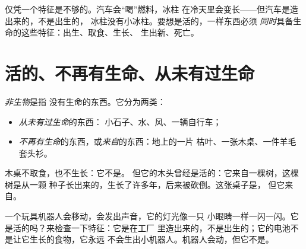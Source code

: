 \begin{remark}[每一个特征都重要]\label{rem:g1:living-or-not:allsigns}
仅凭一个特征是不够的。汽车会“喝”燃料，冰柱
在冷天里会变长——但汽车是造出来的，不是出生的，
冰柱没有小冰柱。要想是活的，一样东西必须
\emph{同时}具备生命的这些特征：出生、取食、生长、
生出新、死亡。
\end{remark}

\section{活的、不再有生命、从未有过生命}

\begin{definition}[非生物]\label{def:g1:living-or-not:nonliving}
\emph{非生物}是指
没有生命的东西。它分为两类：
\begin{itemize}
  \item \emph{从未有过生命}的东西：
        小石子、水、风、一辆自行车；
  \item \emph{不再有生命}的东西，或\emph{来自}的东西：地上的一片
        枯叶、一张木桌、一件羊毛套头衫。
\end{itemize}
\end{definition}

\begin{example}[木桌]\label{ex:g1:living-or-not:table}
木桌不取食，也不生长：它不是。
但它的木头曾经是活的：它来自一棵树，这棵树是从一颗
种子长出来的，生长了许多年，后来被砍倒。这张桌子是，
但它来自。
\end{example}

\begin{example}[机器人呢？]\label{ex:g1:living-or-not:robot}
一个玩具机器人会移动，会发出声音，它的灯光像一只
小眼睛一样一闪一闪。它是活的吗？来检查一下特征：它是在工厂
里造出来的，不是出生的；它的电池不是让它生长的食物，它永远
不会生出小机器人。机器人会动，但它不是。
\end{example}

